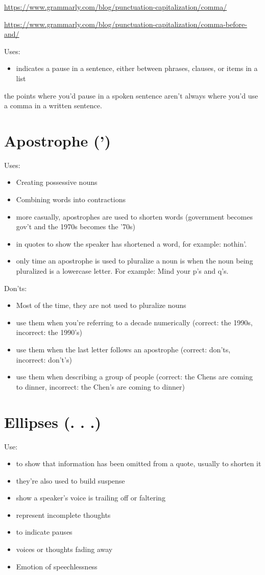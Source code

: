 \documentclass{book}
\begin{document}
\url{https://www.grammarly.com/blog/punctuation-capitalization/comma/}

\url{https://www.grammarly.com/blog/punctuation-capitalization/comma-before-and/}

Uses:
\begin{itemize}
	\item indicates a pause in a sentence, either between phrases, clauses, or items in a list
\end{itemize}

the points where you’d pause in a spoken sentence aren’t always where you’d use a comma in a written sentence.

\section{Apostrophe (')}
Uses:
\begin{itemize}
	\item Creating possessive nouns
	\item Combining words into contractions
	\item more casually, apostrophes are used to shorten words (government becomes gov’t and the 1970s becomes the ’70s)
	\item in quotes to show the speaker has shortened a word, for example: nothin’.
	\item only time an apostrophe is used to pluralize a noun is when the noun being pluralized is a lowercase letter. For example: Mind your p’s and q’s.
\end{itemize}
Don'ts:
\begin{itemize}
	\item Most of the time, they are not used to pluralize nouns
	\item use them when you’re referring to a decade numerically (correct: the 1990s, incorrect: the 1990’s)
	\item use them when the last letter follows an apostrophe (correct: don’ts, incorrect: don’t’s)
	\item use them when describing a group of people (correct: the Chens are coming to dinner, incorrect: the Chen’s are coming to dinner)
\end{itemize}

\section{Ellipses (. . .)}

Use:
\begin{itemize}
	\item to show that information has been omitted from a quote, usually to shorten it
	\item they’re also used to build suspense
	\item show a speaker’s voice is trailing off or faltering
	\item represent incomplete thoughts
	\item to indicate pauses
	\item voices or thoughts fading away
	\item Emotion of speechlessness
\end{itemize}
\end{document}
